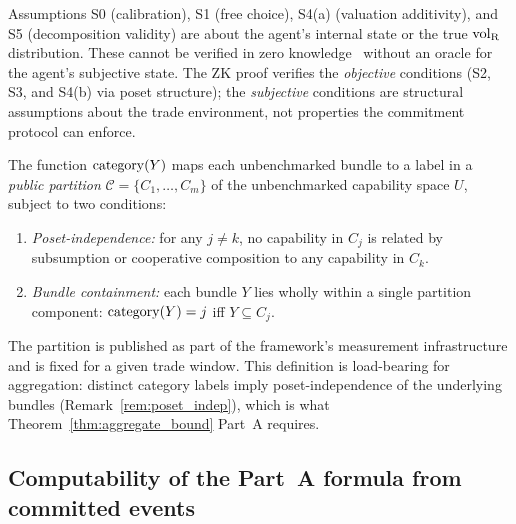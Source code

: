 \begin{remark}
\label{rem:zk_limits}
Assumptions S0 (calibration), S1 (free choice), S4(a) (valuation
additivity), and S5 (decomposition validity) are about the
agent's internal state or the true ${\operatorname{vol}_{\mathrm{R}}}$ distribution.  These
cannot be verified in zero
knowledge~\citep{goldwasser1985knowledge} without an oracle for
the agent's subjective state.  The ZK proof verifies the
\emph{objective} conditions (S2, S3, and S4(b) via poset
structure); the \emph{subjective} conditions are structural
assumptions about the trade environment, not properties the
commitment protocol can enforce.
\end{remark}

\begin{definition}
\label{def:category_partition}
The function $\mathrm{category}(Y)$ maps each unbenchmarked bundle to a label in
a \emph{public partition}
$\mathcal{C} = \{C_1, \ldots, C_m\}$ of the unbenchmarked
capability space $U$, subject to two conditions:
\begin{enumerate}
\item[(i)] \emph{Poset-independence:} for any $j \neq k$, no
  capability in $C_j$ is related by subsumption or cooperative
  composition to any capability in $C_k$.
\item[(ii)] \emph{Bundle containment:} each bundle $Y$ lies
  wholly within a single partition component:
  $\mathrm{category}(Y) = j$ iff $Y \subseteq C_j$.
\end{enumerate}
The partition is published as part of the framework's measurement
infrastructure and is fixed for a given trade window.  This
definition is load-bearing for aggregation: distinct category
labels imply poset-independence of the underlying bundles
(Remark~\ref{rem:poset_indep}), which is what
Theorem~\ref{thm:aggregate_bound} Part~A requires.
\end{definition}

\subsection{Computability of the Part~A formula from committed
events}

